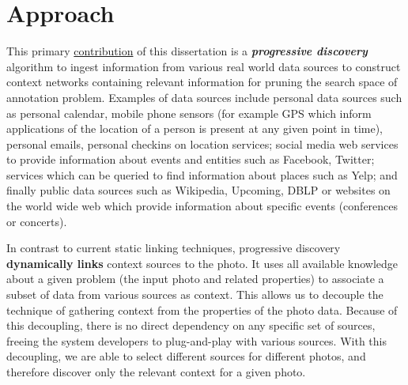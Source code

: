 \section{Approach}
This primary \uline{contribution} of this dissertation is a \textbf{\textit{progressive discovery}} algorithm to ingest information from various real world data sources to construct context networks containing relevant information for pruning the search space of annotation problem. Examples of data sources include personal data sources such as personal calendar, mobile phone sensors (for example GPS which inform applications of the location of a person is present at any given point in time), personal emails, personal checkins on location services; social media web services to provide information about events and entities such as Facebook, Twitter; services which can be queried to find information about places such as Yelp; and finally public data sources such as Wikipedia, Upcoming, DBLP or websites on the world wide web which provide information about specific events (conferences or concerts).

In contrast to current static linking techniques, progressive discovery \textbf{dynamically links} context sources to the photo. It uses all available knowledge about a given problem (the input photo and related properties) to associate a subset of data from various sources as context. This allows us to decouple the technique of gathering context from the properties of the photo data. Because of this decoupling, there is no direct dependency on any specific set of sources, freeing the system developers to plug-and-play with various sources. With this decoupling, we are able to select different sources for different photos, and therefore discover only the relevant context for a given photo.

